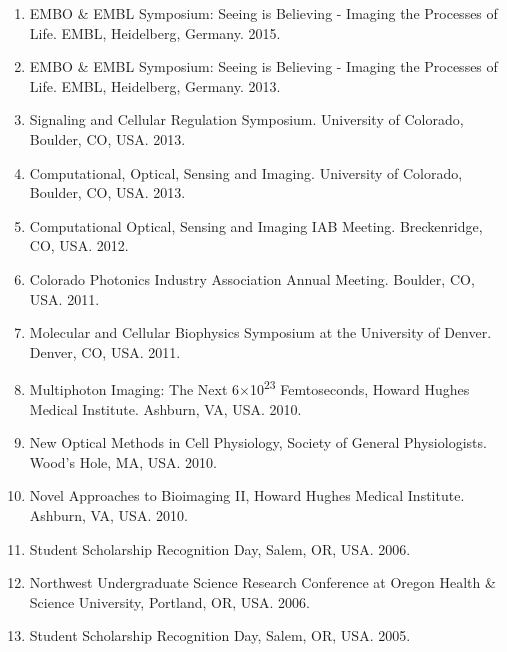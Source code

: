 \begin{enumerate}
\item EMBO \& EMBL Symposium: Seeing is Believing - Imaging the Processes of Life.  EMBL, Heidelberg, Germany.  2015.
\item EMBO \& EMBL Symposium: Seeing is Believing - Imaging the Processes of Life.  EMBL, Heidelberg, Germany. 2013.
\item Signaling and Cellular Regulation Symposium.  University of Colorado, Boulder, CO, USA.  2013.
\item Computational, Optical, Sensing and Imaging.  University of Colorado, Boulder, CO, USA.  2013.
\item Computational Optical, Sensing and Imaging IAB Meeting.  Breckenridge, CO, USA.  2012.
\item Colorado Photonics Industry Association Annual Meeting.  Boulder, CO, USA. 2011.
\item Molecular and Cellular Biophysics Symposium at the University of Denver.  Denver, CO, USA. 2011.
\item Multiphoton Imaging: The Next 6$\times$10\textsuperscript{23} Femtoseconds, Howard Hughes Medical Institute.  Ashburn, VA, USA. 2010.
\item New Optical Methods in Cell Physiology, Society of General Physiologists. Wood's Hole, MA, USA. 2010.
\item Novel Approaches to Bioimaging II, Howard Hughes Medical Institute.  Ashburn, VA, USA. 2010.
\item Student Scholarship Recognition Day, Salem, OR, USA. 2006.
\item Northwest Undergraduate Science Research Conference at Oregon Health \& Science University, Portland, OR, USA. 2006.
\item Student Scholarship Recognition Day, Salem, OR, USA. 2005. 
\end{enumerate}